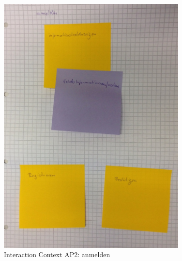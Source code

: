 \begin{figure}[H]
\centering
\includegraphics[angle=90, width=0.85\textwidth] {./images/abstract/version2/anmelden.JPG}
\caption{Interaction Context AP2: anmelden}
\label{interfaceContents40}
\end{figure}

